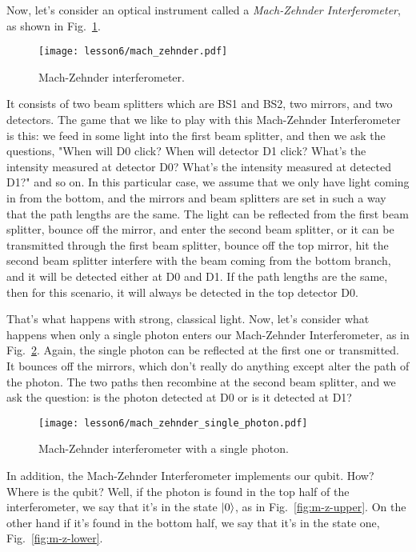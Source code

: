 Now, let's consider an optical instrument called a \emph{Mach-Zehnder Interferometer}, as shown in Fig.~\ref{fig:mach-zehnder}.
\begin{figure}[H]
   \centering
    \texttt{[image: lesson6/mach\_zehnder.pdf]}
    
        \caption{Mach-Zehnder interferometer.}
    \label{fig:mach-zehnder}
    
\end{figure}
It consists of two beam splitters which are BS1 and BS2, two mirrors, and two detectors.  The game that we like to play with this Mach-Zehnder Interferometer is this: we feed in some light into the first beam splitter, and then we ask the questions, "When will D0 click?  When will detector D1 click? What's the intensity measured at detector D0? What's the intensity measured at detected D1?" and so on. In this particular case, we assume that we only have light coming in from the bottom, and the mirrors and beam splitters are set in such a way that the path lengths are the same. The light can be reflected from the first beam splitter, bounce off the mirror, and enter the second beam splitter, or it can be transmitted through the first beam splitter, bounce off the top mirror, hit the second beam splitter interfere with the beam coming from the bottom branch, and it will be detected either at D0 and D1. If the path lengths are the same, then for this scenario, it will always be detected in the top detector D0.

That's what happens with strong, classical light. Now, let's consider what happens when only a single photon enters our Mach-Zehnder Interferometer, as in Fig.~\ref{fig:mach-zehnder-single-photon}. Again, the single photon can be reflected at the first one or transmitted. It bounces off the mirrors, which don't really do anything except alter the path of the photon.  The two paths then recombine at the second beam splitter, and we ask the question: is the photon detected at D0 or is it detected at D1?
\begin{figure}[H]
   \centering
    \texttt{[image: lesson6/mach\_zehnder\_single\_photon.pdf]}
    
        \caption{Mach-Zehnder interferometer with a single photon.}
    \label{fig:mach-zehnder-single-photon}    
\end{figure}

In addition, the Mach-Zehnder Interferometer implements our qubit. How? Where is the qubit? Well, if the photon is found in the top half of the interferometer, we say that it's in the state $\left| 0 \right\rangle$, as in Fig.~\ref{fig:m-z-upper}. On the other hand if it's found in the bottom half, we say that it's in the state one, Fig.~\ref{fig:m-z-lower}. 

